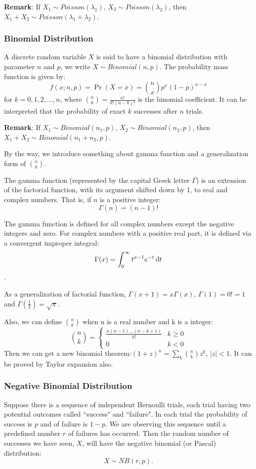 \documentclass[11pt]{article}
\begin{document}
{\bf Remark}: If $X_1 \sim Poisson(\lambda_1)$, $X_2 \sim Poisson(\lambda_2)$, 
then $X_1 + X_2 \sim Poisson(\lambda_1 + \lambda_2)$.

\subsubsection{Binomial Distribution}
A discrete random variable $X$ is said to have a binomial distribution with parameter $n$ and $p$, we write $X \sim Binomial(n,p)$. The probability mass function is given by:
\[f(x;n,p) = \Pr(X = x) = {n\choose x}p^x(1-p)^{n-x}\]
for $k=0,1,2,...,n$, where ${n \choose k} = \frac{n!}{k!(n-k)!}$ is the binomial coefficient. It can be interpreted that the probability of exact $k$ successes after $n$ trials.

{\bf Remark}: If $X_1 \sim Binomial(n_1,p)$, $X_2 \sim Binomial(n_2,p)$, 
then $X_1 + X_2 \sim Binomial(n_1+n_2,p)$.

By the way, we introduce something about gamma function and a generalization form of ${n\choose k}$.

The gamma function (represented by the capital Greek letter $\Gamma$) is an extension of the factorial function, with its argument shifted down by 1, to real and complex numbers. That is, if $n$ is a positive integer:
$$\Gamma(n)=(n-1)!$$

The gamma function is defined for all complex numbers except the negative integers and zero. For complex numbers with a positive real part, it is defined via a convergent improper integral:
$$\Gamma(x) = \int_0^\infty t^{x-1} e^{-t}\,{\rm d}t$$.

As a generalization of factorial function, $\Gamma(x+1)=x\Gamma(x)$, $\Gamma(1)=0!=1$ and $ \Gamma(\frac{1}{2})=\sqrt{\pi}$.

Also, we can define ${n\choose k}$ when n is a real number and k is a integer:
\[{n\choose k} = \left\{\begin{array}{cc}
\frac{n(n-1)\dots(n-k+1)}{k!} & k\ge 0 \\
0 & k<0
\end{array}
\right.
\]
Then we can get a new binomial theorem:$(1+z)^n = \sum_{k}{n \choose k}z^k$, $|z|<1$. It can be proved by Taylor expansion also.
\subsubsection{Negative Binomial Distribution}
Suppose there is a sequence of independent Bernoulli trials, each trial having two potential outcomes called ``success" and ``failure". In each trial the probability of success is $p$ and of failure is $1-p$. We are observing this sequence until a predefined number $r$ of failures has occurred. Then the random number of successes we have seen, $X$, will have the negative binomial (or Pascal) distribution:
\[X \sim NB(r, p).\]
\end{document}
